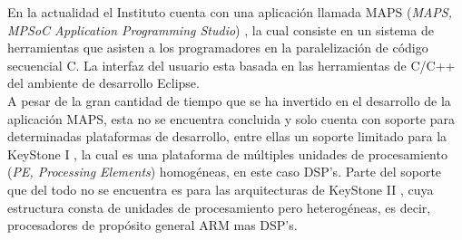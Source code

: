 En la actualidad el Instituto cuenta con una aplicación llamada MAPS (\textit{MAPS, MPSoC Application Programming Studio}) \cite{MAPS1}, la cual
consiste en un sistema de herramientas que asisten a los programadores en la paralelización de código secuencial C. La interfaz del usuario
esta basada en las herramientas de C/C++ del ambiente de desarrollo Eclipse.\\

A pesar de la gran cantidad de tiempo que se ha invertido en el desarrollo de la aplicación MAPS, esta no se encuentra concluida y solo 
cuenta con soporte para determinadas plataformas de desarrollo, entre ellas un soporte limitado para la KeyStone I \cite{KSI1}, la cual es
una plataforma de múltiples unidades de procesamiento (\textit{PE, Processing Elements}) homogéneas, en este caso DSP's. Parte del soporte 
que del todo no se encuentra es para las arquitecturas de KeyStone II \cite{KSII1}, cuya estructura consta de unidades de procesamiento 
pero heterogéneas, es decir, procesadores de propósito general ARM mas DSP's.


